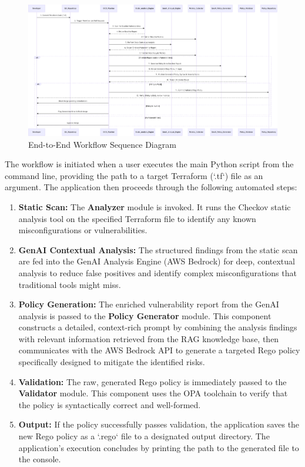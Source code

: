 \begin{landscape}
\thispagestyle{empty}
\begin{figure}[p]
\centering
\includegraphics[width=0.9\linewidth,height=0.7\textheight,keepaspectratio]{Figures/image.pdf}
\caption{End-to-End Workflow Sequence Diagram}
\label{fig:e2e_workflow}
\end{figure}
\end{landscape}

The workflow is initiated when a user executes the main Python script from the command line, providing the path to a target Terraform (`.tf`) file as an argument. The application then proceeds through the following automated steps:

\begin{enumerate}
    \item \textbf{Static Scan:} The \textbf{Analyzer} module is invoked. It runs the Checkov static analysis tool on the specified Terraform file to identify any known misconfigurations or vulnerabilities.
    \item \textbf{GenAI Contextual Analysis:} The structured findings from the static scan are fed into the GenAI Analysis Engine (AWS Bedrock) for deep, contextual analysis to reduce false positives and identify complex misconfigurations that traditional tools might miss.
    \item \textbf{Policy Generation:} The enriched vulnerability report from the GenAI analysis is passed to the \textbf{Policy Generator} module. This component constructs a detailed, context-rich prompt by combining the analysis findings with relevant information retrieved from the RAG knowledge base, then communicates with the AWS Bedrock API to generate a targeted Rego policy specifically designed to mitigate the identified risks.
    \item \textbf{Validation:} The raw, generated Rego policy is immediately passed to the \textbf{Validator} module. This component uses the OPA toolchain to verify that the policy is syntactically correct and well-formed.
    \item \textbf{Output:} If the policy successfully passes validation, the application saves the new Rego policy as a `.rego` file to a designated output directory. The application's execution concludes by printing the path to the generated file to the console.
\end{enumerate}

